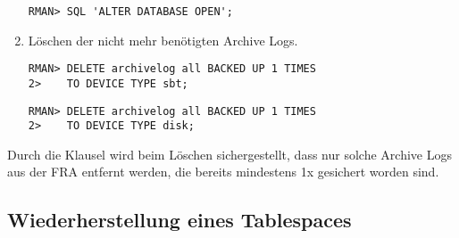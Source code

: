 \begin{enumerate}
              \begin{lstlisting}[caption={\"Offnen der Datenbank nach dem Recovery},label=admin1451,language=rman,emph={[10]ALTER,DATABASE,OPEN},emphstyle={[10]\color{magenta}\bfseries}]
RMAN> SQL 'ALTER DATABASE OPEN';
              \end{lstlisting}
            \item L\"oschen der nicht mehr ben\"otigten Archive Logs.
              \begin{lstlisting}[caption={L\"oschen der Archive Logs, die bereits auf SBT-Tape gesichert wurden},label=admin1452,language=rman]
RMAN> DELETE archivelog all BACKED UP 1 TIMES
2>    TO DEVICE TYPE sbt;
              \end{lstlisting}
              \begin{lstlisting}[caption={L\"oschen der Archive Logs, die bereits auf Disk gesichert wurden},label=admin1453,language=rman]
RMAN> DELETE archivelog all BACKED UP 1 TIMES
2>    TO DEVICE TYPE disk;
              \end{lstlisting}
          \end{enumerate}
          Durch die Klausel  wird beim
          L\"oschen sichergestellt, dass nur solche Archive Logs aus der FRA entfernt werden, die bereits mindestens 1x gesichert worden sind.
      \subsection{Wiederherstellung eines Tablespaces}
